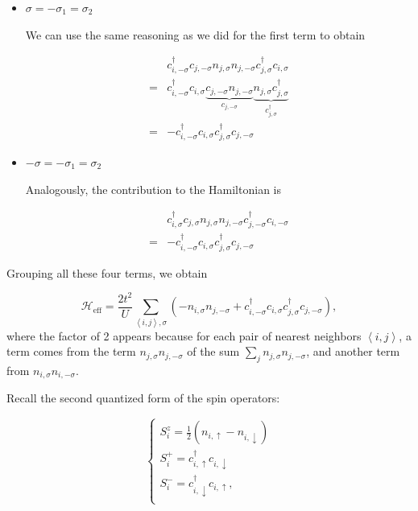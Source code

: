 \documentclass[10pt, twocolumn, twoside]{article}
\begin{document}
\begin{itemize}
\item $\sigma = - \sigma_1 = \sigma_2$

We can use the same reasoning as we did for the first term to obtain

\begin{equation*}
\begin{split}
&c_{i,-\sigma}^\dagger c_{j,-\sigma} n_{j,\sigma} n_{j, -\sigma} c_{j, \sigma}^\dagger c_{i, \sigma} \\
=& c_{i, -\sigma}^\dagger c_{i,\sigma} \underbrace{c_{j,-\sigma} n_{j, -\sigma}}_{c_{j,-\sigma}} \underbrace{n_{j, \sigma} c_{j, \sigma}^\dagger}_{c_{j,\sigma}^\dagger} \\
=& - c_{i, -\sigma}^\dagger c_{i,\sigma} c_{j, \sigma}^\dagger c_{j,-\sigma}
\end{split}
\end{equation*}

\item $-\sigma = - \sigma_1 = \sigma_2$

Analogously, the contribution to the Hamiltonian is

\begin{equation*}
\begin{split}
&c_{i,\sigma}^\dagger c_{j,\sigma} n_{j,\sigma} n_{j, -\sigma} c_{j, -\sigma}^\dagger c_{i, -\sigma} \\
=& - c_{i, -\sigma}^\dagger c_{i,\sigma} c_{j, \sigma}^\dagger c_{j,-\sigma}
\end{split}
\end{equation*}

\end{itemize}

Grouping all these four terms, we obtain

\begin{equation}
\mathcal{H}_{\text{eff}} = \frac{2t^2}{U} \sum_{\left\langle i, j \right\rangle, \sigma} ( - n_{i,\sigma} n_{j,-\sigma} + c_{i,-\sigma}^\dagger c_{i,\sigma} c_{j,\sigma}^\dagger c_{j,-\sigma} ) ,
\end{equation}
where the factor of 2 appears because for each pair of nearest neighbors $\left\langle i, j \right\rangle$, a term comes from the term $n_{j,\sigma} n_{j,-\sigma}$ of the sum $\sum_j n_{j,\sigma} n_{j,-\sigma}$, and another term from $n_{i,\sigma} n_{i,-\sigma}$.

Recall the second quantized form of the spin operators:

\begin{equation}
\begin{cases}
S_i^z = \frac{1}{2} ( n_{i,\uparrow} - n_{i,\downarrow} ) \\
S_i^+ = c_{i,\uparrow}^\dagger c_{i,\downarrow} \\
S_i^- = c_{i,\downarrow}^\dagger c_{i,\uparrow}, \\
\end{cases}
\end{equation}
\end{document}
